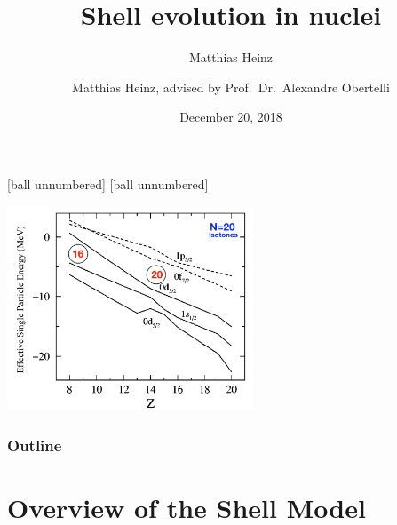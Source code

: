 \documentclass[accentcolor=tud2c,usenames,dvipsnames,colorbacktitle,inverttitle,landscape,german,presentation,t]{tudbeamer}
\begin{document}
\title{Shell evolution in nuclei}
\subtitle{\small{Matthias Heinz}}
\author{Matthias Heinz, advised by Prof.\ Dr.\ Alexandre Obertelli}
\date{December 20, 2018}

[ball unnumbered]
[ball unnumbered]

\nocite{*}

\begin{titleframe}
  \begin{center}
    \includegraphics[trim={1.4cm 0 0 0},clip,width=0.55\textwidth]{images/utsuno_edited}
    \\ \small{\cite{Utsuno:1999st}}
  \end{center}
\end{titleframe}

\begin{frame}
  \frametitle{Outline}
  \tableofcontents
\end{frame}

\section{Overview of the Shell Model}
\end{document}
